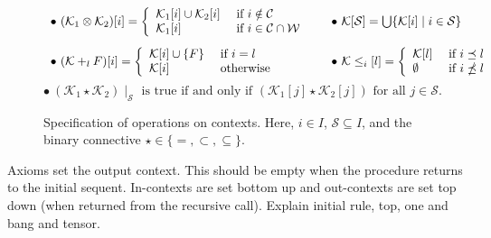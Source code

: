 \documentclass[a4paper, 11pt]{article}
\begin{document}
\begin{figure}[t]
\[
\begin{array}{l@{\qquad}l}
\bullet~(\mathcal{K}_1 \otimes \mathcal{K}_2) [i] = \left\{
\begin{array}{ll}
 \mathcal{K}_1[i] \cup \mathcal{K}_2[i] & \hbox{ if }
i \notin \mathcal{C}\\
 \mathcal{K}_1[i]  & \hbox{ if } i \in \mathcal{C} \cap \mathcal{W}
\end{array}
\right.
& 
\bullet~\mathcal{K}[\mathcal{S}] =
\bigcup\{\mathcal{K}[i]\;|\;i\in \mathcal{S}\}\\[15pt]
\bullet~(\mathcal{K} +_l F) [i] = \left\{
\begin{array}{ll}
 \mathcal{K}[i] \cup \{F\} & \hbox{ if } i = l\\
 \mathcal{K}[i]  & \hbox{ otherwise }
\end{array}
\right.
&
\bullet~ \mathcal{K} \leq_i[l] = \left\{
\begin{array}{ll}
 \mathcal{K}[l] & \hbox{ if } i \preceq l\\
 \emptyset & \hbox{ if } i \npreceq l 
\end{array}
\right.
\end{array}
\]
\[
\bullet~ (\mathcal{K}_1 \star \mathcal{K}_2)\mid_\mathcal{S}
\textrm{ is true if and only if }(\mathcal{K}_1[j]
\star \mathcal{K}_2[j]) \textrm{ for all $j \in \mathcal{S}$.}
\]
\caption{Specification of operations on contexts. Here, 
$i \in I$, $\mathcal{S} \subseteq I$, and the 
binary connective $\star \in \{=, \subset, \subseteq\}$.}
\label{Fig:Contexts}
\vspace{-5mm}
\end{figure}

Axioms set the output context. This should be empty when the procedure returns
to the initial sequent. In-contexts are set bottom up and out-contexts are set
top down (when returned from the recursive call).
Explain initial rule, top, one and bang and tensor.
\end{document}
